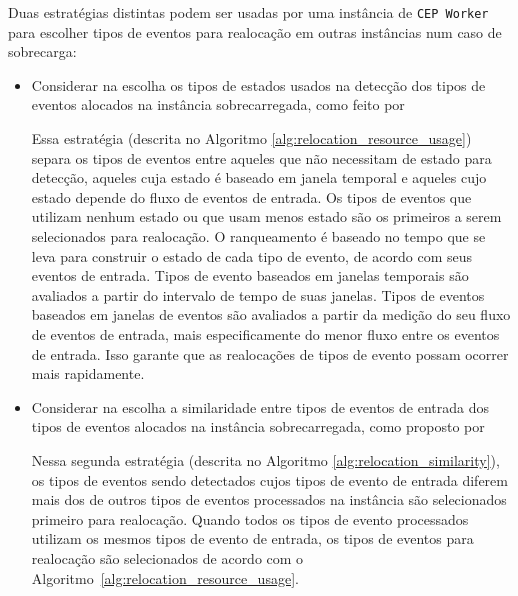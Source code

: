 Duas estratégias distintas podem ser usadas por uma instância de \texttt{CEP Worker} para escolher tipos de eventos para realocação em outras instâncias num caso de sobrecarga:
\begin{itemize}
   
    \item Considerar na escolha os tipos de estados usados na detecção dos tipos de eventos alocados na instância sobrecarregada, como feito por \cite{6906776}%
    
    Essa estratégia (descrita no Algoritmo \ref{alg:relocation_resource_usage}) separa os tipos de eventos entre aqueles 
    que não necessitam de estado para detecção, aqueles cuja estado é baseado em janela temporal e aqueles cujo estado depende do fluxo de eventos de entrada. Os tipos de eventos que utilizam nenhum estado ou que usam menos estado são os primeiros a serem selecionados para realocação. O ranqueamento é baseado no tempo que se leva para construir o estado de cada tipo de evento, de acordo com seus eventos de entrada. Tipos de evento baseados em janelas temporais são avaliados a partir do intervalo de tempo de suas janelas. Tipos de eventos baseados em janelas de eventos são avaliados a partir da medição do seu fluxo de eventos de entrada, mais especificamente do menor fluxo entre os eventos de entrada. Isso garante que as realocações de tipos de evento possam ocorrer mais rapidamente.%
    
     \item Considerar na escolha a similaridade entre tipos de eventos de entrada dos tipos de eventos alocados na instância sobrecarregada, como proposto por \cite{Isoyama:2012:SCE:2335484.2335498}
     
     Nessa segunda estratégia (descrita no Algoritmo \ref{alg:relocation_similarity}), os tipos de eventos sendo detectados cujos tipos de evento de entrada diferem mais dos de outros tipos de eventos processados na instância são selecionados primeiro para realocação. Quando todos os tipos de evento processados utilizam os mesmos tipos de evento de entrada, os tipos de eventos para realocação são selecionados de acordo com o Algoritmo~\ref{alg:relocation_resource_usage}.

\end{itemize}

